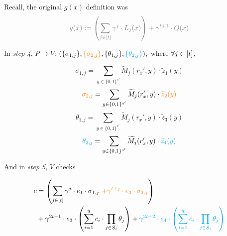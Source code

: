 \documentclass{article}
\theoremstyle{definition}
\begin{document}

Recall, the original $g(x)$ definition was
$$\textcolor{gray}{g(x) := \left( \sum_{j \in [t]} \gamma^j \cdot L_j(x) \right) + \gamma^{t+1} \cdot Q(x)}$$



\vspace{0.5cm}
In \emph{step 4}, $P \rightarrow V$:
$(\{\sigma_{1,j}\}, \textcolor{orange}{\{\sigma_{2,j}\}}, \{\theta_{1,j}\}, \textcolor{cyan}{\{\theta_{2,j}\}}),~ \text{where} ~\forall j \in [t]$,

$$\sigma_{1,j} = \sum_{y \in \{0,1\}^{s'}} \widetilde{M}_j(r_x', y) \cdot \widetilde{z}_1(y)$$
$$\textcolor{orange}{\sigma_{2,j}} = \sum_{y \in \{0,1\}^{s'}} \widetilde{M}_j(r_x', y) \cdot \textcolor{orange}{\widetilde{z}_2(y)}$$
$$\theta_{1,j} = \sum_{y \in \{0, 1\}^{s'}} \widetilde{M}_j(r_x', y) \cdot \widetilde{z}_3(y)$$
$$\textcolor{cyan}{\theta_{2,j}} = \sum_{y \in \{0, 1\}^{s'}} \widetilde{M}_j(r_x', y) \cdot \textcolor{cyan}{\widetilde{z}_4(y)}$$


\vspace{1cm}

And in \emph{step 5}, $V$ checks

\begin{align*}
	c &= \left(\sum_{j \in [t]} \gamma^j \cdot e_1 \cdot \sigma_{1,j}
~\textcolor{orange}{+ \gamma^{t+j} \cdot e_2 \cdot \sigma_{2,j}}\right)\\
	  &+ \gamma^{2t+1} \cdot e_3 \cdot \left( \sum_{i=1}^q c_i \cdot \prod_{j \in S_i} \theta_j \right)
	  + \textcolor{cyan}{\gamma^{2t+2} \cdot e_4 \cdot \left( \sum_{i=1}^q c_i \cdot \prod_{j \in S_i} \theta_j \right)} 
\end{align*}
\end{document}
